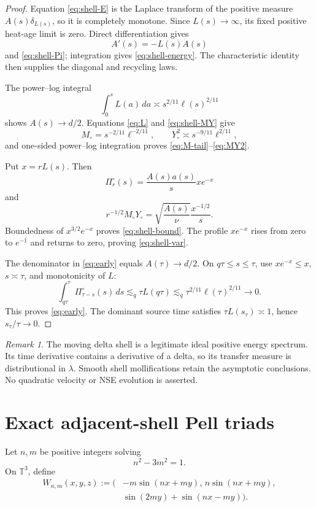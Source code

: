 \documentclass[11pt]{article}
\theoremstyle{remark}
\newtheorem{remark}[theorem]{Remark}
\newcommand{\T}{\mathbb T}
\begin{document}
\begin{proof}
Equation \eqref{eq:shell-E} is the Laplace transform of the positive
measure \(A(s)\delta_{L(s)}\), so it is completely monotone.  Since
\(L(s)\to\infty\), its fixed positive heat-age limit is zero.  Direct
differentiation gives
\[
 A'(s)=-L(s)A(s)
\]
and \eqref{eq:shell-Pi}; integration gives
\eqref{eq:shell-energy}.  The characteristic identity then supplies
the diagonal and recycling laws.

The power--log integral
\[
 \int_0^sL(a)\,da
 \asymp s^{2/11}\ell(s)^{2/11}
\]
shows \(A(s)\to d/2\).  Equations \eqref{eq:L} and
\eqref{eq:shell-MY} give
\[
 M_\circ=s^{-2/11}\ell^{-2/11},
 \qquad
 Y_\circ^2\asymp s^{-9/11}\ell^{2/11},
\]
and one-sided power--log integration proves
\eqref{eq:M-tail}--\eqref{eq:MY2}.

Put \(x=rL(s)\).  Then
\[
 \Pi^\circ_r(s)=\frac{A(s)a(s)}sxe^{-x}
\]
and
\[
 r^{-1/2}M_\circ Y_\circ
 =
 \sqrt{\frac{A(s)}{\nu}}\frac{x^{-1/2}}s.
\]
Boundedness of \(x^{3/2}e^{-x}\) proves
\eqref{eq:shell-bound}.  The profile \(xe^{-x}\) rises from zero to
\(e^{-1}\) and returns to zero, proving \eqref{eq:shell-var}.

The denominator in \eqref{eq:early} equals \(A(\tau)\to d/2\).
On \(q\tau\le s\le\tau\), use \(xe^{-x}\le x\), \(s\asymp\tau\), and
monotonicity of \(L\):
\[
 \int_{q\tau}^{\tau}\Pi^\circ_{\tau-s}(s)\,ds
 \lesssim_q\tau L(q\tau)
 \lesssim_q
 \tau^{2/11}\ell(\tau)^{2/11}\longrightarrow0.
\]
This proves \eqref{eq:early}.  The dominant source time satisfies
\(\tau L(s_\tau)\asymp1\), hence \(s_\tau/\tau\to0\).
\end{proof}

\begin{remark}
The moving delta shell is a legitimate ideal positive energy spectrum.
Its time derivative contains a derivative of a delta, so its transfer
measure is distributional in \(\lambda\).  Smooth shell mollifications
retain the asymptotic conclusions.  No quadratic velocity or NSE
evolution is asserted.
\end{remark}

\section{Exact adjacent-shell Pell triads}

Let \(n,m\) be positive integers solving
\begin{equation}
\label{eq:Pell}
 n^2-3m^2=1.
\end{equation}
On \(\T^3\), define
\begin{equation}
\label{eq:W}
\begin{aligned}
 W_{n,m}(x,y,z)
 :=
 \bigl(
 &-m\sin(nx+my),\,
 n\sin(nx+my),\\
 &\sin(2my)+\sin(nx-my)
 \bigr).
\end{aligned}
\end{equation}
\end{document}
